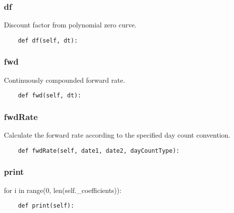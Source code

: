 \documentclass[twoside,11pt]{book}
\begin{document}
\subsubsection*{{\bf df}}
Discount factor from polynomial zero curve. 

\begin{lstlisting}
    def df(self, dt):
\end{lstlisting}

\subsubsection*{{\bf fwd}}
Continuously compounded forward rate.  

\begin{lstlisting}
    def fwd(self, dt):
\end{lstlisting}

\subsubsection*{{\bf fwdRate}}
Calculate the forward rate according to the specified day count convention.  

\begin{lstlisting}
    def fwdRate(self, date1, date2, dayCountType):
\end{lstlisting}

\subsubsection*{{\bf print}}
for i in range(0, len(self.\_coefficients)): 

\begin{lstlisting}
    def print(self):
\end{lstlisting}
\end{document}
